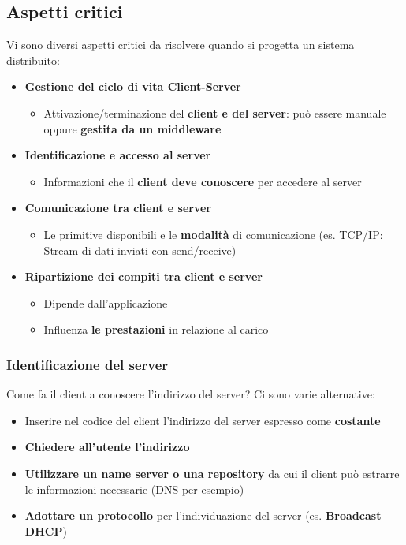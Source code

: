 \documentclass[12pt]{article}
\begin{document}
\subsection{Aspetti critici}
Vi sono diversi aspetti critici da risolvere quando si progetta un sistema distribuito:
\begin{itemize}
    \item \textbf{Gestione del ciclo di vita Client-Server}
          \begin{itemize}
              \item Attivazione/terminazione del \textbf{client e del server}: può essere manuale oppure \textbf{gestita da un middleware}
          \end{itemize}
          \newpage
    \item \textbf{Identificazione e accesso al server}
          \begin{itemize}
              \item Informazioni che il \textbf{client deve conoscere} per accedere al server
          \end{itemize}
    \item \textbf{Comunicazione tra client e server}
          \begin{itemize}
              \item Le primitive disponibili e le \textbf{modalità} di comunicazione (es. TCP/IP: Stream di dati inviati con send/receive)
          \end{itemize}
    \item \textbf{Ripartizione dei compiti tra client e server}
          \begin{itemize}
              \item Dipende dall'applicazione
              \item Influenza \textbf{le prestazioni} in relazione al carico
          \end{itemize}
\end{itemize}
\subsubsection{Identificazione del server}
Come fa il client a conoscere l'indirizzo del server? Ci sono varie alternative:
\begin{itemize}
    \item Inserire nel codice del client l'indirizzo del server espresso come \textbf{costante}
    \item \textbf{Chiedere all'utente l'indirizzo}
    \item \textbf{Utilizzare un name server o una repository} da cui il client può estrarre le informazioni necessarie (DNS per esempio)
    \item \textbf{Adottare un protocollo} per l'individuazione del server (es. \textbf{Broadcast DHCP})
\end{itemize}
\end{document}
